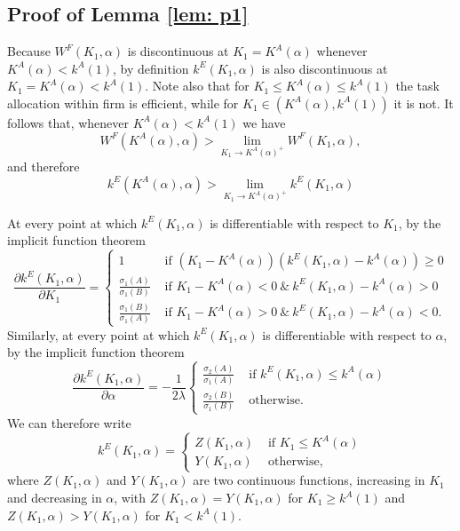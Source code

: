 \documentclass[12pt,american]{paper}
\theoremstyle{remark}
\begin{document}
\subsection*{Proof of Lemma \ref{lem: p1}}

Because $W^F(K_1,\alpha)$ is discontinuous at $K_1=K^A(\alpha)$ whenever $K^A(\alpha)<k^A(1)$, by definition $k^E(K_1,\alpha)$ is also discontinuous at $K_1=K^A(\alpha)<k^A(1)$. Note also that for $K_1 \leq K^A(\alpha) \leq k^A(1)$ the task allocation within firm is efficient, while for $K_1\in (K^A(\alpha),k^A(1))$ it is not. It follows that, whenever $K^A(\alpha)<k^A(1)$ we have
\[
W^F(K^A(\alpha),\alpha) > \lim_{K_1\rightarrow K^A(\alpha)^{+}} W^F(K_1,\alpha),
\]
and therefore
\[
k^E(K^A(\alpha),\alpha) > \lim_{K_1\rightarrow K^A(\alpha)^{+}} k^E(K_1,\alpha)
\]

At every point at which $k^E(K_1,\alpha)$ is differentiable with respect to $K_1$, by the implicit function theorem 
\[
\frac{\partial k^E(K_1,\alpha)}{\partial K_1}=\begin{cases} 1 & \mbox{ if } (K_1 - K^A(\alpha))(k^E(K_1,\alpha)-k^A(\alpha))\geq 0 \\ 
\frac{\sigma_1(A)}{\sigma_1(B)} &\mbox{ if }  K_1 - K^A(\alpha)<0~\& ~ k^E(K_1,\alpha)-k^A(\alpha)>0 \\ 
\frac{\sigma_1(B)}{\sigma_1(A)} &\mbox{ if } K_1 - K^A(\alpha)>0~\& ~ k^E(K_1,\alpha)-k^A(\alpha)<0.
\end{cases}
\]
Similarly,  at every point at which $k^E(K_1,\alpha)$ is differentiable with respect to $\alpha$, by the implicit function theorem
\[
\frac{\partial k^E(K_1,\alpha)}{\partial \alpha}=- \frac{1}{2 \lambda}\begin{cases} \frac{\sigma_2(A)}{\sigma_1(A)} &\mbox{ if } k^E(K_1,\alpha)\leq k^A(\alpha) \\ \frac{\sigma_2(B)}{\sigma_1(B)} &\mbox{ otherwise. } \end{cases}
\]
We can therefore write
\[
k^E(K_1,\alpha) =\begin{cases} Z(K_1,\alpha) &\mbox{ if } K_1 \leq K^A(\alpha) \\
Y(K_1, \alpha) &\mbox{ otherwise,} 
\end{cases}
\]
where $Z(K_1,\alpha)$ and $Y(K_1,\alpha)$ are two continuous functions, increasing in $K_1$ and decreasing in $\alpha$, with $Z(K_1,\alpha)=Y(K_1,\alpha)$ for $K_1 \geq k^A(1)$ and $Z(K_1,\alpha) > Y(K_1,\alpha)$ for  $K_1<k^A(1)$.
\end{document}
